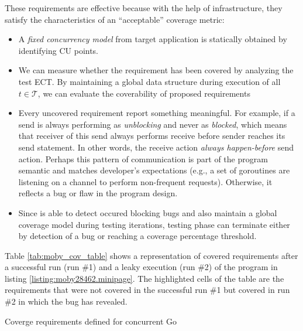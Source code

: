 These requirements are effective because with the help of \goat infrastructure, they satisfy the characteristics of an ``acceptable'' coverage metric:
\begin{itemize}
  \item A \textit{fixed concurrency model} from target application is statically obtained by identifying CU points.
  \item We can measure whether the requirement has been covered by analyzing the test ECT. By maintaining a global data structure during execution of all $t \in \mathcal{T}$, we can evaluate the coverability of proposed requirements
  \item Every uncovered requirement report something meaningful. For example, if a send is always performing as \textit{unblocking} and never as \textit{blocked}, which means that receiver of this send always performs receive before sender reaches its send statement. In other words, the receive action \textit{always happen-before} send action. Perhaps this pattern of communication is part of the program semantic and matches developer's expectations (e.g., a set of goroutines are listening on a channel to perform non-frequent requests). Otherwise, it reflects a bug or flaw in the program design.
  \item Since \goat is able to detect occured blocking bugs and also maintain a global coverage model during testing iterations, testing phase can terminate either by detection of a bug or reaching a coverage percentage threshold.
\end{itemize}

Table \ref{tab:moby_cov_table} shows a representation of covered requirements after a successful run (run \#1) and a leaky execution (run \#2) of the program in listing \ref{listing:moby28462.minipage}.
%
The highlighted cells of the table are the requirements that were not covered in the successful run \#1 but covered in run \#2 in which the bug has revealed.
%



\begin{table}[]
\centering
\caption{Coverge requirements defined for concurrent Go}
\scalebox{0.9}{

}
\label{tab:cov_req}
\end{table}




